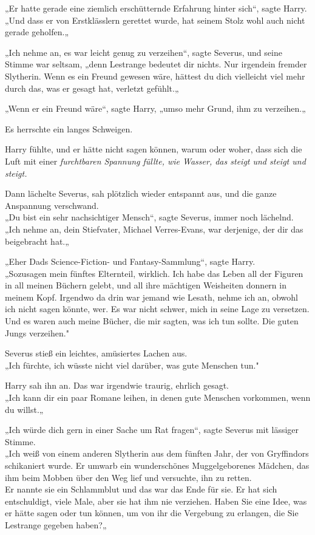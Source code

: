 {„Er hatte gerade eine ziemlich erschütternde Erfahrung hinter sich“, sagte Harry.\\ „Und dass er von Erstklässlern gerettet wurde, hat seinem Stolz wohl auch nicht gerade geholfen.„

„Ich nehme an, es war leicht genug zu verzeihen“, sagte Severus, und seine Stimme war seltsam, „denn Lestrange bedeutet dir nichts. Nur irgendein fremder Slytherin. Wenn es ein Freund gewesen wäre, hättest du dich vielleicht viel mehr durch das, was er gesagt hat, verletzt gefühlt.„

„Wenn er ein Freund wäre“, sagte Harry, „umso mehr Grund, ihm zu verzeihen.„

Es herrschte ein langes Schweigen.

Harry fühlte, und er hätte nicht sagen können, warum oder woher, dass sich die Luft mit einer \emph{furchtbaren Spannung füllte, wie Wasser, das steigt und steigt und steigt.}

Dann lächelte Severus, sah plötzlich wieder entspannt aus, und die ganze Anspannung verschwand.\\ „Du bist ein sehr nachsichtiger Mensch“, sagte Severus, immer noch lächelnd.\\ „Ich nehme an, dein Stiefvater, Michael Verres-Evans, war derjenige, der dir das beigebracht hat.„

„Eher Dads Science-Fiction- und Fantasy-Sammlung“, sagte Harry.\\ „Sozusagen mein fünftes Elternteil, wirklich. Ich habe das Leben all der Figuren in all meinen Büchern gelebt, und all ihre mächtigen Weisheiten donnern in meinem Kopf. Irgendwo da drin war jemand wie Lesath, nehme ich an, obwohl ich nicht sagen könnte, wer. Es war nicht schwer, mich in seine Lage zu versetzen.\\ Und es waren auch meine Bücher, die mir sagten, was ich tun sollte. Die guten Jungs verzeihen."

Severus stieß ein leichtes, amüsiertes Lachen aus.\\ „Ich fürchte, ich wüsste nicht viel darüber, was gute Menschen tun."

Harry sah ihn an. Das war irgendwie traurig, ehrlich gesagt.\\ „Ich kann dir ein paar Romane leihen, in denen gute Menschen vorkommen, wenn du willst.„

„Ich würde dich gern in einer Sache um Rat fragen“, sagte Severus mit lässiger Stimme.\\ „Ich weiß von einem anderen Slytherin aus dem fünften Jahr, der von Gryffindors schikaniert wurde. Er umwarb ein wunderschönes Muggelgeborenes Mädchen, das ihm beim Mobben über den Weg lief und versuchte, ihn zu retten.\\ Er nannte sie ein Schlammblut und das war das Ende für sie. Er hat sich entschuldigt, viele Male, aber sie hat ihm nie verziehen. Haben Sie eine Idee, was er hätte sagen oder tun können, um von ihr die Vergebung zu erlangen, die Sie Lestrange gegeben haben?„

}
